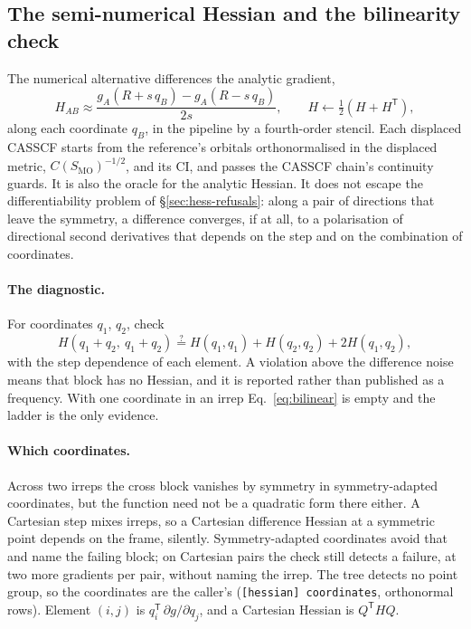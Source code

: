 \documentclass[11pt]{article}
\newcommand{\code}[1]{\texttt{#1}}
\newcommand{\T}{\mathsf T}
\begin{document}
\subsection{The semi-numerical Hessian and the bilinearity check}
\label{sec:seminumerical}

The numerical alternative differences the analytic gradient,
\begin{equation}
  H_{AB} \approx \frac{g_A(R + s\,q_B) - g_A(R - s\,q_B)}{2s},\qquad
  H \leftarrow \tfrac12(H + H^\T),
  \label{eq:semi}
\end{equation}
along each coordinate $q_B$, in the pipeline by a fourth-order stencil.
Each displaced CASSCF starts from the reference's orbitals orthonormalised
in the displaced metric, $C(S_{\mathrm{MO}})^{-1/2}$, and its CI, and passes
the CASSCF chain's continuity guards. It is also the oracle for the analytic
Hessian. It does not escape the differentiability problem of
\S\ref{sec:hess-refusals}: along a pair of directions that leave the
symmetry, a difference converges, if at all, to a polarisation of
directional second derivatives that depends on the step and on the
combination of coordinates.

\paragraph{The diagnostic.} For coordinates $q_1$, $q_2$, check
\begin{equation}
  H(q_1 + q_2,\ q_1 + q_2) \stackrel{?}{=} H(q_1, q_1) + H(q_2, q_2) + 2H(q_1, q_2),
  \label{eq:bilinear}
\end{equation}
with the step dependence of each element. A violation above the difference
noise means that block has no Hessian, and it is reported rather than
published as a frequency. With one coordinate in an irrep
Eq.~\eqref{eq:bilinear} is empty and the ladder is the only evidence.

\paragraph{Which coordinates.} Across two irreps the cross block vanishes
by symmetry in symmetry-adapted coordinates, but the function need not be a
quadratic form there either. A Cartesian step mixes irreps, so a Cartesian
difference Hessian at a symmetric point depends on the frame, silently.
Symmetry-adapted coordinates avoid that and name the failing block; on
Cartesian pairs the check still detects a failure, at two more gradients
per pair, without naming the irrep. The tree detects no point group, so the
coordinates are the caller's (\code{[hessian] coordinates}, orthonormal
rows). Element $(i, j)$ is $q_i^\T\,\partial g/\partial q_j$, and a Cartesian
Hessian is $Q^\T HQ$.
\end{document}
